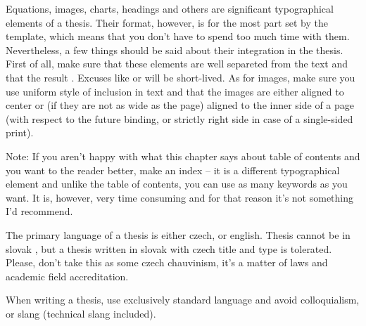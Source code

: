 Equations, images, charts, headings and others are significant typographical elements of a thesis. Their format, however, is for the most part  set by the template, which means that you don't have to spend too much time with them. Nevertheless, a few things should be said about their integration in the thesis. First of all, make sure that these  elements are well separeted from the text and that the result . Excuses like  or  will be short-lived. As for images, make sure you use uniform style of inclusion in text and that the images are either aligned to center or (if they are not as wide as the page) aligned to the inner side of a page (with respect to the future binding, or strictly right side in case of a single-sided print).

Note: If you aren't happy with what this chapter says about table of contents and you want to  the reader better, make an index -- it is a different typographical element and unlike the table of contents, you can use as many keywords as you want. It is, however, very time consuming and for that reason it's not something I'd recommend.
\rm

The primary language of a thesis is either czech, or english. Thesis cannot be in slovak , but a thesis written in slovak with czech title and type is tolerated. Please, don't take this as some czech chauvinism, it's a matter of laws and academic field accreditation.

When writing a thesis, use exclusively standard language and avoid colloquialism, or slang (technical slang included).

